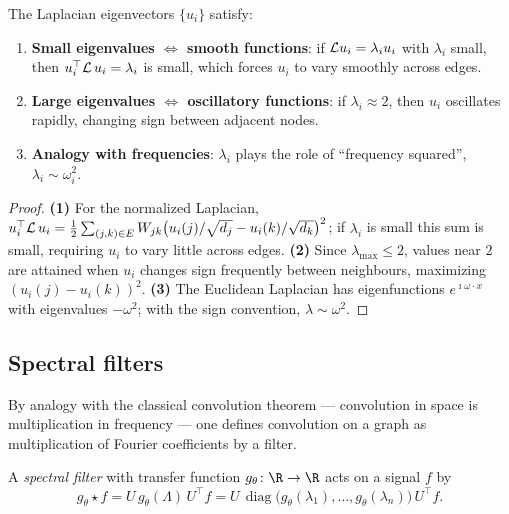 \begin{theorem}
\label{thm:graphs:frequency}
The Laplacian eigenvectors $\{u_i\}$ satisfy:
\begin{enumerate}
  \item \textbf{Small eigenvalues $\Leftrightarrow$ smooth functions}: if
        $\mathcal{L} u_i = \lambda_i u_i$ with $\lambda_i$ small, then
        $u_i^\top \mathcal{L}\, u_i = \lambda_i$ is small, which forces $u_i$ to vary
        smoothly across edges.
  \item \textbf{Large eigenvalues $\Leftrightarrow$ oscillatory functions}: if
        $\lambda_i \approx 2$, then $u_i$ oscillates rapidly, changing sign
        between adjacent nodes.
  \item \textbf{Analogy with frequencies}: $\lambda_i$ plays the role of
        ``frequency squared'', $\lambda_i \sim \omega_i^2$.
\end{enumerate}
\end{theorem}

\begin{proof}
\textbf{(1)} For the normalized Laplacian,
$u_i^\top \mathcal{L}\, u_i = \tfrac12 \sum_{(j,k)\in E} W_{jk}
\big(u_i(j)/\sqrt{d_j} - u_i(k)/\sqrt{d_k}\big)^2$; if $\lambda_i$ is small this
sum is small, requiring $u_i$ to vary little across edges.
\textbf{(2)} Since $\lambda_{\max} \le 2$, values near $2$ are attained when
$u_i$ changes sign frequently between neighbours, maximizing
$(u_i(j) - u_i(k))^2$. \textbf{(3)} The Euclidean Laplacian has eigenfunctions
$e^{\imath \omega \cdot x}$ with eigenvalues $-\omega^2$; with the sign
convention, $\lambda \sim \omega^2$.
\end{proof}

\subsection{Spectral filters}
\label{sec:graphs:filters}

By analogy with the classical convolution theorem --- convolution in space is
multiplication in frequency --- one defines convolution on a graph as
multiplication of Fourier coefficients by a filter.

\begin{definition}
\label{def:graphs:spectral-filter}
A \emph{spectral filter} with transfer function $g_\theta \colon \R \to \R$ acts
on a signal $f$ by
\[
  g_\theta \star f
    = U\, g_\theta(\Lambda)\, U^\top f
    = U\, \operatorname{diag}\!\big(g_\theta(\lambda_1), \dots, g_\theta(\lambda_n)\big)\, U^\top f .
\]
\end{definition}

